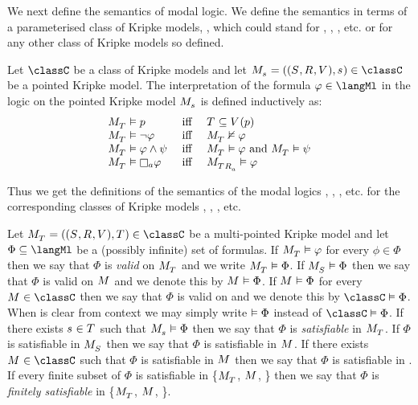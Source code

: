 We next define the semantics of modal logic.
We define the semantics in terms of a parameterised class of Kripke models, \classC{}, which could stand for \classK{}, \classKF{}, \classKFF{}, etc. or for any other class of Kripke models so defined.

\begin{definition}
Let $\classC$ be a class of Kripke models and let $\pointedModelAndTuple{\stateS} \in \classC$ be a pointed Kripke model.
The interpretation of the formula $\phi \in \langMl$ in the logic \logicC{} on the pointed Kripke model $\pointedModel{\stateS}$ is defined inductively as:
$$
\begin{array}{lcl}
\pointedModel{\statesT} \entails \atomP & \text{ iff } & \statesT \subseteq \valuation(\atomP)\\
\pointedModel{\statesT} \entails \lnot \phi & \text{ iff } & \pointedModel{\statesT} \nentails \phi\\
\pointedModel{\statesT} \entails \phi \land \psi & \text{ iff } & \pointedModel{\statesT} \entails \phi \text{ and } \pointedModel{\statesT} \entails \psi\\
\pointedModel{\statesT} \entails \necessary[\agentA] \phi & \text{ iff } & \pointedModel{\successors{\agentA}{\statesT}} \entails \phi
\end{array}
$$
\end{definition}

Thus we get the definitions of the semantics of the modal logics \logicK{}, \logicKF{}, \logicKFF{}, etc. for the corresponding classes of Kripke models \classK{}, \classKF{}, \classKFF{}, etc.

Let $\pointedModelAndTuple{\statesT} \in \classC$ be a multi-pointed Kripke model and
let $\Phi \subseteq \langMl$ be a (possibly infinite) set of formulas.
If $\pointedModel{\statesT} \entails \phi$ for every $\phi \in \Phi$ then we say that $\Phi$ is {\em valid} on $\pointedModel{\statesT}$ and we write $\pointedModel{\statesT} \entails \Phi$.
If $\pointedModel{\states} \entails \Phi$ then we say that $\Phi$ is valid on $\model$ and we denote this by $\model \entails \Phi$.
If $\model \entails \Phi$ for every $\model \in \classC$ then we say that $\Phi$ is valid on \classC{} and we denote this by $\classC \entails \Phi$.
When \classC{} is clear from context we may simply write $\vDash \Phi$ instead of $\classC \entails \Phi$.
If there exists $\stateS \in \statesT$ such that $\pointedModel{\stateS} \entails \Phi$ then we say that $\Phi$ is {\em satisfiable} in $\pointedModel{\statesT}$.
If $\Phi$ is satisfiable in $\pointedModel{\states}$ then we say that $\Phi$ is satisfiable in $\model$.
If there exists $\model \in \classC$ such that $\Phi$ is satisfiable in $\model$ then we say that $\Phi$ is satisfiable in \classC{}.
If every finite subset of $\Phi$ is satisfiable in \{$\pointedModel{\statesT}$, $\model$, \classC{}\} then we say that $\Phi$ is {\em finitely satisfiable} in \{$\pointedModel{\statesT}$, $\model$, \classC{}\}.


